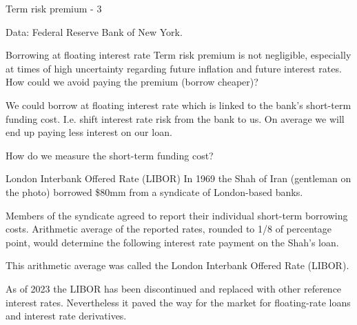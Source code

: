 \documentclass{beamer}
\begin{document}
\begin{frame}{Term risk premium - 3}
\center
{}

\scriptsize Data: Federal Reserve Bank of New York.
\end{frame}



\begin{frame}{Borrowing at floating interest rate}
\justify
Term risk premium is not negligible, especially at times of high uncertainty regarding future inflation and future interest rates. How could we avoid paying the premium (borrow cheaper)?

\justify
We could borrow at floating interest rate which is linked to the bank's short-term funding cost. I.e. shift interest rate risk from the bank to us. On average we will end up paying less interest on our loan.

\justify
How do we measure the short-term funding cost?
\end{frame}



\begin{frame}{London Interbank Offered Rate (LIBOR)}
\justify
In 1969 the Shah of Iran (gentleman on the photo) borrowed \$80mm from a syndicate of London-based banks.

\justify
Members of the syndicate agreed to report their individual short-term borrowing costs. Arithmetic average of the reported rates, rounded to 1/8 of percentage point, would determine the following interest rate payment on the Shah's loan.

\justify
This arithmetic average was called the \alert{London Interbank Offered Rate (LIBOR)}. 
 
\justify
As of 2023 the LIBOR has been discontinued and replaced with other reference interest rates. Nevertheless it paved the way for the market for floating-rate loans and interest rate derivatives.
\end{frame}
\end{document}

